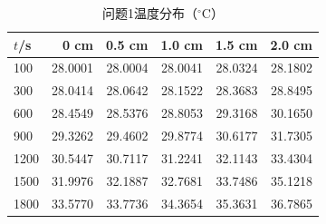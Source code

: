 \begin{table}[!htbp]\centering
\caption{问题1温度分布（$^\circ$C）}
\begin{tabular}{lrrrrr}\toprule
$t$/s & 0 cm & 0.5 cm & 1.0 cm & 1.5 cm & 2.0 cm\\\midrule
100 & 28.0001 & 28.0004 & 28.0041 & 28.0324 & 28.1802\\
300 & 28.0414 & 28.0642 & 28.1522 & 28.3683 & 28.8495\\
600 & 28.4549 & 28.5376 & 28.8053 & 29.3168 & 30.1650\\
900 & 29.3262 & 29.4602 & 29.8774 & 30.6177 & 31.7305\\
1200 & 30.5447 & 30.7117 & 31.2241 & 32.1143 & 33.4304\\
1500 & 31.9976 & 32.1887 & 32.7681 & 33.7486 & 35.1218\\
1800 & 33.5770 & 33.7736 & 34.3654 & 35.3631 & 36.7865\\
\bottomrule\end{tabular}\end{table}
